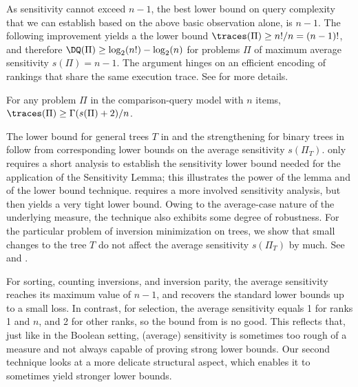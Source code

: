 As sensitivity cannot exceed $n-1$, the best lower bound on query complexity that we can establish based on the above basic observation alone, is $n-1$. The following improvement yields a the lower bound $\traces(\Pi) \ge n!/n = (n-1)!$, and therefore $\DQ(\Pi) \ge \log_2(n!) - \log_2(n)$ for problems $\Pi$ of maximum average sensitivity $s(\Pi)=n-1$. The argument hinges on an efficient encoding of rankings that share the same execution trace. See  for more details.

\begin{lemma}\label{lemma:sensitivity}
For any problem $\Pi$ in the comparison-query model with $n$ items, $\traces(\Pi) \ge \Gamma(s(\Pi)+2)/n$. 
\end{lemma}

The lower bound for general trees $T$ in  and the strengthening for binary trees in  follow from corresponding lower bounds on the average sensitivity $s(\Pi_T)$.  only requires a short analysis to establish the sensitivity lower bound needed for the application of the Sensitivity Lemma; this illustrates the power of the lemma and of the lower bound technique.  requires a more involved sensitivity analysis, but then yields a very tight lower bound. Owing to the average-case nature of the underlying measure, the technique also exhibits some degree of robustness. For the particular problem of inversion minimization on trees, we show that small changes to the tree $T$ do not affect the average sensitivity $s(\Pi_T)$ by much. See  and .

For sorting, counting inversions, and inversion parity, the average sensitivity reaches its maximum value of $n-1$, and  recovers the standard lower bounds up to a small loss. In contrast, for selection, the average sensitivity equals 1 for ranks 1 and $n$, and 2 for other ranks, so the bound from  is no good. This reflects that, just like in the Boolean setting, (average) sensitivity is sometimes too rough of a measure and not always capable of proving strong lower bounds. Our second technique looks at a more delicate structural aspect, which enables it to sometimes yield stronger lower bounds. 

